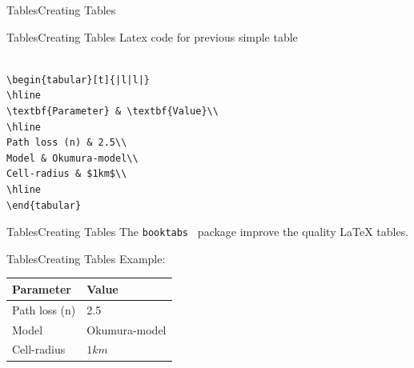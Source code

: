 \documentclass{beamer}
\begin{document}
\begin{darkframes}
\begin{frame}[fragile]{Tables}{Creating Tables}
\end{frame}

\begin{frame}[fragile]{Tables}{Creating Tables}
Latex code for previous simple table\\
	\begin{verbatim}

\begin{tabular}[t]{|l|l|}
\hline 
\textbf{Parameter} & \textbf{Value}\\
\hline 
Path loss (n) & 2.5\\
Model & Okumura-model\\
Cell-radius & $1km$\\
\hline
\end{tabular}
	\end{verbatim}
	
	
\end{frame}


\begin{frame}[fragile]{Tables}{Creating Tables}
The \alert{\texttt{booktabs }} package  improve the quality  LaTeX tables.
\end{frame}

\begin{frame}[fragile]{Tables}{Creating Tables}
	\alert{Example:} 
	
	\centering
	\begin{tabular}[t]{ll}
		\toprule
		\textbf{Parameter} & \textbf{Value}\\
		\midrule
		Path loss (n) & 2.5\\
		Model & Okumura-model\\
		Cell-radius & $1km$\\
		\bottomrule
	\end{tabular}
	
\end{frame}


\end{darkframes}
\end{document}
